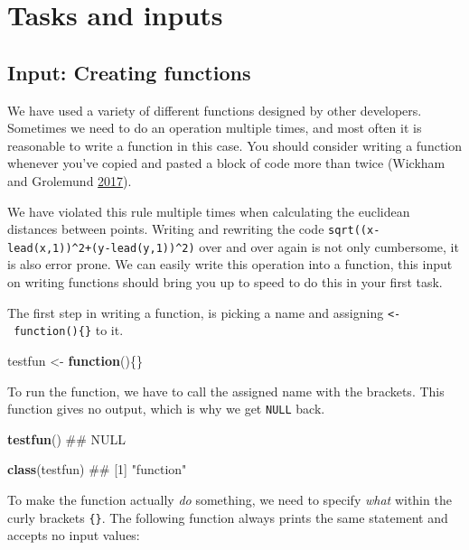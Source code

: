 \documentclass[]{book}
\newenvironment{Shaded}{\begin{snugshade}}{\end{snugshade}}
\newcommand{\KeywordTok}[1]{\textcolor[rgb]{0.13,0.29,0.53}{\textbf{#1}}}
\newcommand{\StringTok}[1]{\textcolor[rgb]{0.31,0.60,0.02}{#1}}
\newcommand{\ControlFlowTok}[1]{\textcolor[rgb]{0.13,0.29,0.53}{\textbf{#1}}}
\newcommand{\NormalTok}[1]{#1}
\begin{document}
\section{Tasks and inputs}\label{tasks-and-inputs-3}

\subsection{Input: Creating functions}\label{input-creating-functions}

We have used a variety of different functions designed by other
developers. Sometimes we need to do an operation multiple times, and
most often it is reasonable to write a function in this case. You should
consider writing a function whenever you've copied and pasted a block of
code more than twice (Wickham and Grolemund
\protect\hyperlink{ref-wickham2017}{2017}).

We have violated this rule multiple times when calculating the euclidean
distances between points. Writing and rewriting the code
\texttt{sqrt((x-lead(x,1))\^{}2+(y-lead(y,1))\^{}2)} over and over again
is not only cumbersome, it is also error prone. We can easily write this
operation into a function, this input on writing functions should bring
you up to speed to do this in your first task.

The first step in writing a function, is picking a name and assigning
\texttt{\textless{}-\ function()\{\}} to it.

\begin{Shaded}
\begin{Highlighting}[]
\NormalTok{testfun <-}\StringTok{ }\ControlFlowTok{function}\NormalTok{()\{\}}
\end{Highlighting}
\end{Shaded}

To run the function, we have to call the assigned name with the
brackets. This function gives no output, which is why we get
\texttt{NULL} back.

\begin{Shaded}
\begin{Highlighting}[]
\KeywordTok{testfun}\NormalTok{()}
\NormalTok{## NULL}

\KeywordTok{class}\NormalTok{(testfun)}
\NormalTok{## [1] "function"}
\end{Highlighting}
\end{Shaded}

To make the function actually \emph{do} something, we need to specify
\emph{what} within the curly brackets \texttt{\{\}}. The following
function always prints the same statement and accepts no input values:
\end{document}
